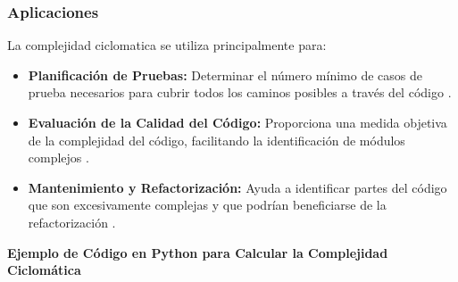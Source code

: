 \documentclass[10pt,authoryear,onecolumn]{article}
\begin{document}
\subsubsection{Aplicaciones}
La complejidad ciclomatica se utiliza principalmente para:
\begin{itemize}
    \item \textbf{Planificación de Pruebas:} Determinar el número mínimo de casos de prueba necesarios para cubrir todos los caminos posibles a través del código \parencite{peitek2020empirical}.
    \item \textbf{Evaluación de la Calidad del Código:} Proporciona una medida objetiva de la complejidad del código, facilitando la identificación de módulos complejos \parencite{scalabrino2019from}.
    \item \textbf{Mantenimiento y Refactorización:} Ayuda a identificar partes del código que son excesivamente complejas y que podrían beneficiarse de la refactorización \parencite{monteiro2019measuring}.
\end{itemize}

\newpage
\textbf{Ejemplo de Código en Python para Calcular la Complejidad Ciclomática}
\end{document}
